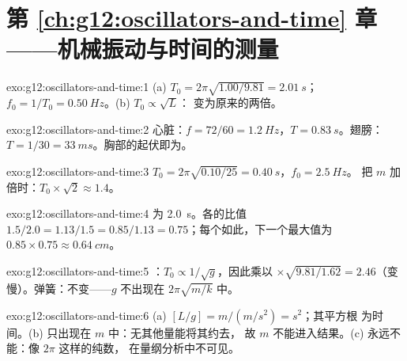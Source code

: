 \section*{第 \ref{ch:g12:oscillators-and-time} 章——机械振动与时间的测量}

\begin{solution}{exo:g12:oscillators-and-time:1}
(a) $T_0 = 2\pi\sqrt{1.00/9.81} = \qty{2.01}{s}$；
$f_0 = 1/T_0 = \qty{0.50}{Hz}$。(b) $T_0 \propto \sqrt{L}$：
变为原来的两倍。
\end{solution}

\begin{solution}{exo:g12:oscillators-and-time:2}
心脏：$f = 72/60 = \qty{1.2}{Hz}$，$T = \qty{0.83}{s}$。翅膀：
$T = 1/30 = \qty{33}{ms}$。胸部的起伏即为\emph{}。
\end{solution}

\begin{solution}{exo:g12:oscillators-and-time:3}
$T_0 = 2\pi\sqrt{0.10/25} = \qty{0.40}{s}$，$f_0 = \qty{2.5}{Hz}$。
把 $m$ 加倍时：$T_0 \times \sqrt{2} \approx 1.4$。
\end{solution}

\begin{solution}{exo:g12:oscillators-and-time:4}
为 \qty{2.0}{s}。各的比值 $1.5/2.0 = 1.13/1.5 = 0.85/1.13
= 0.75$；每个如此，下一个最大值为 $0.85 \times 0.75 \approx
\qty{0.64}{cm}$。
\end{solution}

\begin{solution}{exo:g12:oscillators-and-time:5}
：$T_0 \propto 1/\sqrt{g}$，因此乘以 $\times\sqrt{9.81/1.62} =
2.46$（变慢）。弹簧：不变——$g$ 不出现在
$2\pi\sqrt{m/k}$ 中。
\end{solution}

\begin{solution}{exo:g12:oscillators-and-time:6}
(a) $[L/g] = \unit{m}/(\unit{m/s^2}) = \unit{s^2}$；其平方根
为时间。(b) 只出现在 $m$ 中：无其他量能将其约去，
故 $m$ 不能进入结果。(c) 永远不能：像 $2\pi$ 这样的纯数，
在量纲分析中不可见。
\end{solution}

